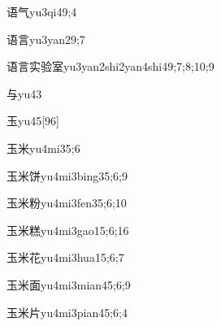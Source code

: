 \begin{verbete}{语气}{yu3qi4}{9;4}
\end{verbete}

\begin{verbete}{语言}{yu3yan2}{9;7}
\end{verbete}

\begin{verbete}{语言实验室}{yu3yan2shi2yan4shi4}{9;7;8;10;9}
\end{verbete}

\begin{verbete}{与}{yu4}{3}
\end{verbete}

\begin{verbete}{玉}{yu4}{5}[96]
\end{verbete}

\begin{verbete}{玉米}{yu4mi3}{5;6}
\end{verbete}

\begin{verbete}{玉米饼}{yu4mi3bing3}{5;6;9}
\end{verbete}

\begin{verbete}{玉米粉}{yu4mi3fen3}{5;6;10}
\end{verbete}

\begin{verbete}{玉米糕}{yu4mi3gao1}{5;6;16}
\end{verbete}

\begin{verbete}{玉米花}{yu4mi3hua1}{5;6;7}
\end{verbete}

\begin{verbete}{玉米面}{yu4mi3mian4}{5;6;9}
\end{verbete}

\begin{verbete}{玉米片}{yu4mi3pian4}{5;6;4}
\end{verbete}

